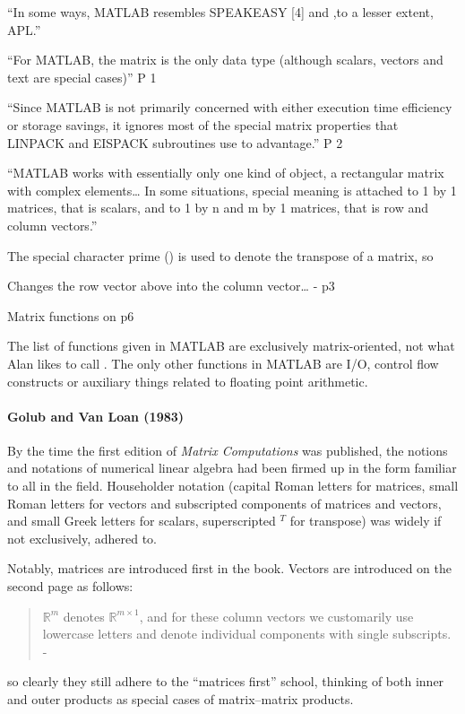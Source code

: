 ``In some ways, MATLAB resembles SPEAKEASY [4] and ,to a lesser extent, APL.''

``For MATLAB, the matrix is the only data type (although scalars, vectors and text are special cases)''
 P 1

``Since MATLAB is not primarily concerned with either execution time efficiency or storage savings, it ignores most of the special matrix properties that LINPACK and EISPACK subroutines use to advantage.'' P 2

``MATLAB works with essentially only one kind of object, a rectangular matrix with complex elements… In some situations, special meaning is attached to 1 by 1 matrices, that is scalars, and to 1 by n and m by 1 matrices, that is row and column vectors.''

The special character prime () is used to denote the transpose of a matrix, so


Changes the row vector above into the column vector… - p3

Matrix functions on p6

The list of functions given in MATLAB are exclusively matrix-oriented, not what Alan likes to call . The only other functions in MATLAB are I/O, control flow constructs or auxiliary things related to floating point arithmetic.


\paragraph{Golub and Van Loan (1983)~\cite{Golub1983}}

By the time the first edition of \textit{Matrix Computations} was published,
the notions and notations of numerical linear algebra had been firmed up in the
form familiar to all in the field. Householder notation (capital Roman letters
for matrices, small Roman letters for vectors and subscripted components of matrices and vectors,
and small Greek letters for scalars, superscripted $^T$ for transpose) was widely
if not exclusively, adhered to.

Notably, matrices are introduced first in the book.
Vectors are introduced on the second page as follows:
%
\begin{quote}
$\mathbb R^m$ denotes $\mathbb R^{m\times1}$, and for these column vectors we customarily use
lowercase letters and denote individual components with single subscripts.
- \cite[p. 2]{Golub1983}
\end{quote}
%
so clearly they still adhere to the ``matrices first'' school, thinking of both
inner and outer products as special cases of matrix--matrix products.

